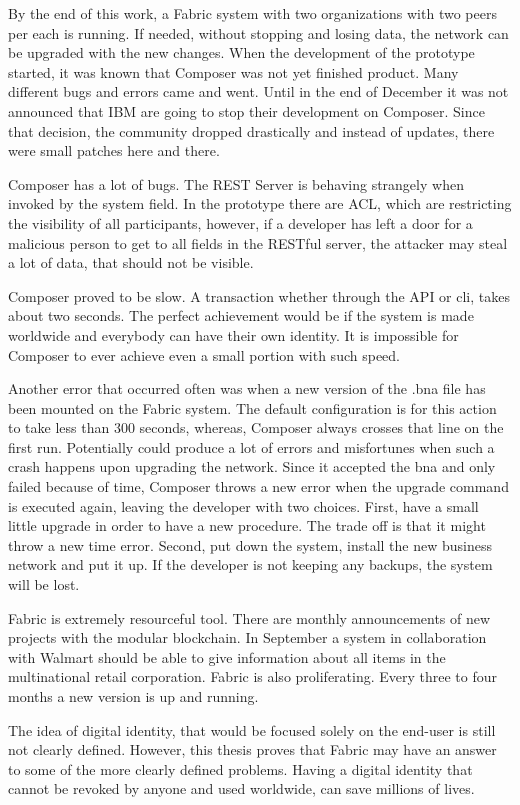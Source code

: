 \documentclass[a4paper,11pt]{report}
\begin{document}
By the end of this work, a Fabric system with two organizations with two peers per each is running. If needed, without stopping and losing data, the network can be upgraded with the new changes. When the development of the prototype started, it was known that Composer was not yet finished product. Many different bugs and errors came and went. Until in the end of December it was not announced that IBM are going to stop their development on Composer. Since that decision, the community dropped drastically and instead of updates, there were small patches here and there. 

Composer has a lot of bugs. The REST Server is behaving strangely when invoked by the system field. In the prototype there are ACL, which are restricting the visibility of all participants, however, if a developer has left a door for a malicious person to get to all fields in the RESTful server, the attacker may steal a lot of data, that should not be visible. 

Composer proved to be slow. A transaction whether through the API or cli, takes about two seconds. The perfect achievement would be if the system is made worldwide and everybody can have their own identity. It is impossible for Composer to ever achieve even a small portion with such speed.  

Another error that occurred often was when a new version of the .bna file has been mounted on the Fabric system. The default configuration is for this action to take less than 300 seconds, whereas, Composer always crosses that line on the first run. Potentially could produce a lot of errors and misfortunes when such a crash happens upon upgrading the network. Since it accepted the bna and only failed because of time, Composer throws a new error when the upgrade command is executed again, leaving the developer with two choices. First, have a small little upgrade in order to have a new procedure. The trade off is that it might throw a new time error. Second, put down the system, install the new business network and put it up. If the developer is not keeping any backups, the system will be lost.  

Fabric is extremely resourceful tool. There are monthly announcements of new projects with the modular blockchain. In September a system in collaboration with Walmart should be able to give information about all items in the multinational retail corporation. Fabric is also proliferating. Every three to four months a new version is up and running. 

The idea of digital identity, that would be focused solely on the end-user is still not clearly defined. However, this thesis proves that Fabric may have an answer to some of the more clearly defined problems. Having a digital identity that cannot be revoked by anyone and used worldwide, can save millions of lives.   
\end{document}
